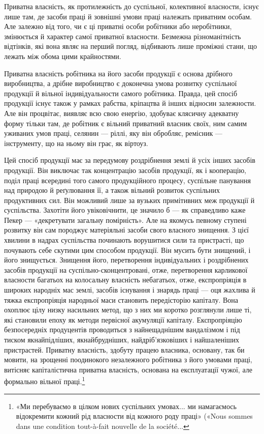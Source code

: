 Приватна власність, як протилежність до суспільної, колективної
власности, існує лише там, де засоби праці й зовнішні
умови праці належать приватним особам. Але залежно від того,
чи є ці приватні особи робітники або неробітники, змінюється
й характер самої приватної власности. Безмежна різноманітність
відтінків, які вона являє на перший погляд, відбивають лише
проміжні стани, що лежать між обома цими крайностями.

Приватна власність робітника на його засоби продукції є
основа дрібного виробництва, а дрібне виробництво є доконечна
умова розвитку суспільної продукції й вільної індивідуальности
самого робітника. Правда, цей спосіб продукції існує також у
рамках рабства, кріпацтва й інших відносин залежности. Але
він процвітає, виявляє всю свою енергію, здобуває клясичну
адекватну форму тільки там, де робітник є вільний приватний
власник своїх, ним самим уживаних умов праці, селянин — ріллі,
яку він обробляє, ремісник — інструменту, що на ньому він грає,
як віртоуз.

Цей спосіб продукції має за передумову роздрібнення землі
й усіх інших засобів продукції. Він виключає так концентрацію
засобів продукції, як і кооперацію, поділ праці всередині того
самого продукційного процесу, суспільне панування над природою
й реґулювання її, а також вільний розвиток суспільних продуктивних
сил. Він можливий лише за вузьких примітивних
меж продукції й суспільства. Захотіти його увіковічнити, це
значило б — як справедливо каже Пекер — «декретувати
загальну помірність». Але на якомусь певному ступені розвитку
він сам породжує матеріяльні засоби свого власного знищення.
З цієї хвилини в надрах суспільства починають ворушитися
сили та пристрасті, що почувають себе скутими цим способом
продукції. Він мусить бути знищений, і його знищується. Знищення
його, перетворення індивідуальних і роздрібнених засобів
продукції на суспільно-сконцентровані, отже, перетворення
карликової власности багатьох на колосальну власність
небагатьох, отже, експропріяція в широких народніх мас землі,
засобів існування і знарядь праці — оця жахлива й тяжка
експропріяція народньої маси становить передісторію капіталу.
Вона охоплює цілу низку насильних метод, що з них ми коротко
розглянули лише ті, які становили епоху як методи первісної
акумуляції капіталу. Експропріяцію безпосередніх продуцентів
проводиться з найнещаднішим вандалізмом і під тиском
якнайпідліших, якнайбрудніших, найдріб’язковіших і найшаленіших
пристрастей. Приватну власність, здобуту працею власника,
основану, так би мовити, на зрощенні поодинокого незалежного
робітника з його умовами праці, витісняє капіталістична
приватна власність, основана на експлуатації чужої, але формально
вільної праці.\footnote{
«Ми перебуваємо в цілком нових суспільних умовах... ми намагаємось
відокремити кожний рід власности від кожного роду праці»
(«Nous sommes dans une condition tout-à-fait nouvelle de la société...
}